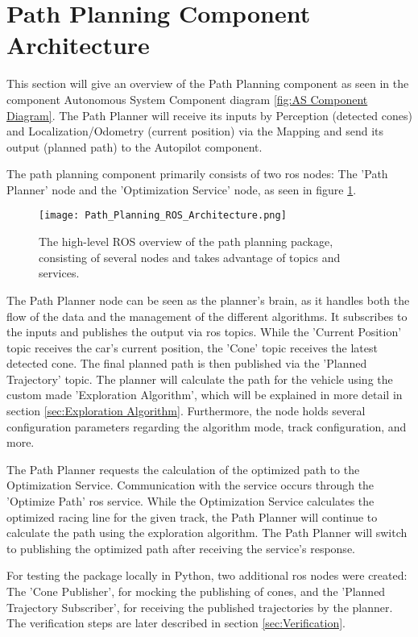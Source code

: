 \section{Path Planning Component Architecture} \label{sec:Path Planning Component Architecture}
This section will give an overview of the Path Planning component as seen in the component Autonomous System Component diagram \ref{fig:AS Component Diagram}. The Path Planner will receive its inputs by Perception (detected cones) and Localization/Odometry (current position) via the Mapping and send its output (planned path) to the Autopilot component.

The path planning component primarily consists of two \acrshort{ros} nodes: The 'Path Planner' node and the 'Optimization Service' node, as seen in figure \ref{fig:Path Planning ROS Architecture}.
\begin{figure}[H]
    \centering
    \texttt{[image: Path\_Planning\_ROS\_Architecture.png]}
    \caption{The high-level ROS overview of the path planning package, consisting of several nodes and takes advantage of topics and services.}
    \label{fig:Path Planning ROS Architecture}
\end{figure}

The Path Planner node can be seen as the planner's brain, as it handles both the flow of the data and the management of the different algorithms. It subscribes to the inputs and publishes the output via \acrshort{ros} topics. While the 'Current Position' topic receives the car's current position, the 'Cone' topic receives the latest detected cone. The final planned path is then published via the 'Planned Trajectory' topic. The planner will calculate the path for the vehicle using the custom made 'Exploration Algorithm', which will be explained in more detail in section \ref{sec:Exploration Algorithm}. Furthermore, the node holds several configuration parameters regarding the algorithm mode, track configuration, and more.

The Path Planner requests the calculation of the optimized path to the Optimization Service. Communication with the service occurs through the 'Optimize Path' \acrshort{ros} service. While the Optimization Service calculates the optimized racing line for the given track, the Path Planner will continue to calculate the path using the exploration algorithm. The Path Planner will switch to publishing the optimized path after receiving the service's response.

For testing the package locally in Python, two additional \acrshort{ros} nodes were created: The 'Cone Publisher', for mocking the publishing of cones, and the 'Planned Trajectory Subscriber', for receiving the published trajectories by the planner. The verification steps are later described in section \ref{sec:Verification}.


